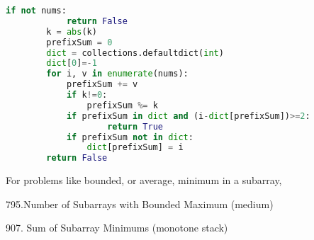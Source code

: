 \documentclass[../main.tex]{subfiles}
\begin{document}
\begin{enumerate}
\begin{lstlisting}[language=Python]
        if not nums:
            return False
        k = abs(k)
        prefixSum = 0
        dict = collections.defaultdict(int)
        dict[0]=-1
        for i, v in enumerate(nums):
            prefixSum += v
            if k!=0:
                prefixSum %= k
            if prefixSum in dict and (i-dict[prefixSum])>=2:
                    return True
            if prefixSum not in dict:
                dict[prefixSum] = i
        return False
\end{lstlisting}
\end{enumerate}


For problems like bounded, or average, minimum in a subarray,
\begin{examples}[resume]
\item 795.Number of Subarrays with Bounded Maximum (medium)
\item 907. Sum of Subarray Minimums (monotone stack)
\end{examples}




                
\end{document}
